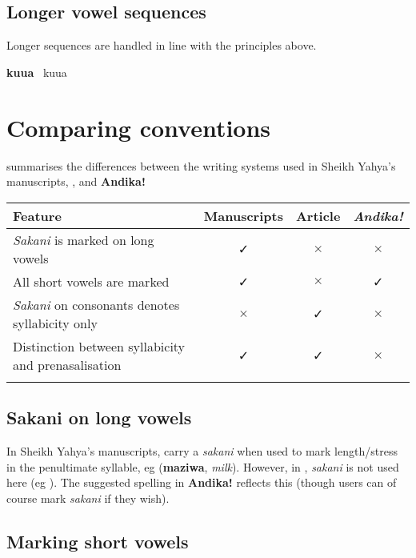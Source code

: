 \subsection{Longer vowel sequences}

Longer sequences are handled in line with the principles above.

\hangindent=3cm
\textbf{kuua} \textrightarrow\ kuua \textrightarrow\ 



\section{Comparing conventions}
\label{s:comparison}

 summarises the differences between the writing systems used in Sheikh Yahya's manuscripts, \citet{Omar1997}, and \textbf{Andika!}

\begin{longtable}[c]{lccc}
\textbf{Feature} & \textbf{Manuscripts} & \textbf{Article} & \textbf{\textit{Andika!}} \\
\hline\noalign{\medskip}
\textit{Sakani} is marked on long vowels & ✓ & $\times$ & $\times$ \\
All short vowels are marked & ✓ & $\times$ & ✓ \\
\textit{Sakani} on consonants denotes syllabicity only & $\times$ & ✓ & $\times$ \\
Distinction between syllabicity and prenasalisation & ✓ & ✓ & $\times$ \\
\label{tab:comp}
\end{longtable}

\subsection{Sakani on long vowels}

In Sheikh Yahya's manuscripts,  carry a \textit{sakani} when used to mark length/stress in the penultimate syllable, eg  (\textbf{maziwa}, \textit{milk}). However, in \citet{Omar1997}, \textit{sakani} is not used here (eg ). The suggested spelling in \textbf{Andika!} reflects this (though users can of course mark \textit{sakani} if they wish).

\subsection{Marking short vowels}

